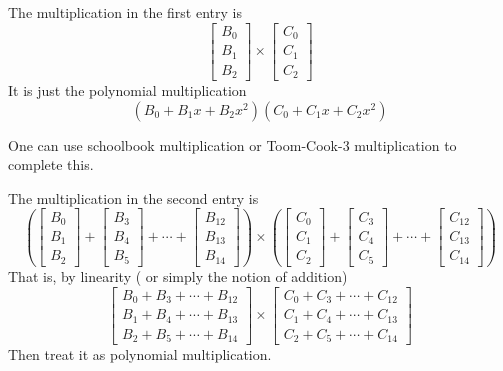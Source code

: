 \documentclass[
11pt,notheorems,hyperref={pdfauthor=whatever}
]{beamer}
\begin{document}
\begin{frame}
    The multiplication in the first entry is 
    \[
\begin{bmatrix}
    B_{0} \\ B_{1} \\ B_{2}
\end{bmatrix}
\times 
\begin{bmatrix}
    C_{0} \\ C_{1} \\ C_{2}
\end{bmatrix}
    \]
    It is just the polynomial multiplication
    \[
    \left(B_{0}+ B_{1}x+B_{2}x^{2} \right)
    \left(C_{0}+ C_{1}x+C_{2}x^{2} \right)
    \]

    One can use schoolbook multiplication or Toom-Cook-3 multiplication to complete this.
\end{frame}

\begin{frame}
    The multiplication in the second entry is 
    \[
    \left(    \begin{bmatrix}
            B_{0} \\ B_{1} \\ B_{2}
        \end{bmatrix}+
        \begin{bmatrix}
            B_{3} \\ B_{4} \\ B_{5}
        \end{bmatrix}+\cdots+\begin{bmatrix}
            B_{12} \\ B_{13} \\ B_{14}
        \end{bmatrix}\right)
    \times 
    \left(\begin{bmatrix}
        C_{0} \\ C_{1} \\ C_{2}
    \end{bmatrix}+
    \begin{bmatrix}
        C_{3} \\ C_{4} \\ C_{5}
    \end{bmatrix}+\cdots+\begin{bmatrix}
        C_{12} \\ C_{13} \\ C_{14}
    \end{bmatrix}\right)
    \]
    That is, by linearity ( or simply the notion of addition)
    \[
\begin{bmatrix}
    B_{0}+B_{3} +\cdots + B_{12} \\ B_{1}+B_{4} +\cdots+B_{13} \\ B_{2}+B_{5} +\cdots+B_{14}
\end{bmatrix}
\times 
\begin{bmatrix}
    C_{0}+C_{3}+\cdots+C_{12} \\ C_{1}+C_{4}+\cdots +C_{13} \\ C_{2}+C_{5} +\cdots+C_{14}
\end{bmatrix}
    \]
    Then treat it as polynomial multiplication.
\end{frame}
\end{document}

